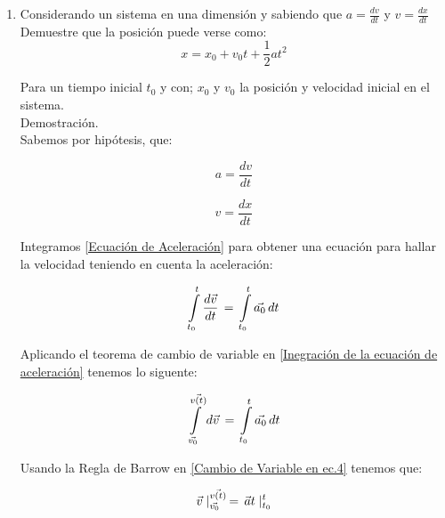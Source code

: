 \documentclass[letterpaper, 12pt]{article}
\begin{document}
\begin{enumerate}
    \item Considerando un sistema en una dimensión y sabiendo que $a = \frac{dv}{dt}$ y $v = \frac{dx}{dt}$ Demuestre que la posición puede verse como: 
    \begin{equation}
        \label{Ecuación a demostrar}
        x = x_{0} + v_{0}t + \frac{1}{2} at^{2}
    \end{equation}
    
    Para un tiempo inicial $t_{0}$ y con; $x_{0}$ y $v_{0}$ la posición y velocidad inicial en el sistema.\\
    
    Demostración.\\
    
    Sabemos por hipótesis, que: 
    
    \begin{equation}
        \label{Ecuación de Aceleración}
        a = \frac{dv}{dt}
    \end{equation}
    
    \begin{equation}
        \label{Ecuación de velocidad}
        v = \frac{dx}{dt}
    \end{equation}
    
    Integramos \ref{Ecuación de Aceleración} para obtener una ecuación para hallar la velocidad teniendo en cuenta la aceleración: 
    
    \begin{equation}
        \label{Inegración de la ecuación de aceleración}
        \int\limits_{t_{0}}^{t} \frac{d\Vec{v}}{dt} \thinspace = \thinspace \int\limits_{t_{0}}^{t} \Vec{a_{0}} \thinspace dt
    \end{equation}
    
    Aplicando el teorema de cambio de variable en \ref{Inegración de la ecuación de aceleración} tenemos lo siguente:
    
    \begin{equation}
        \label{Cambio de Variable en ec.4}
        \int\limits_{\Vec{v_{0}}}^{\Vec{v(t)}} d\Vec{v} \thinspace = \thinspace \int\limits_{t_{0}}^{t} \Vec{a_{0}} \thinspace dt
    \end{equation}
    
    Usando la Regla de Barrow en \ref{Cambio de Variable en ec.4} tenemos que:
    
    \begin{equation}
        \label{Regla de Barrow en ec.5}
        \vec{v}\mid_{\vec{v_{0}}}^{\vec{v(t)}} \thinspace = \thinspace \vec{a}t\mid_{t_{0}}^{t}
    \end{equation}
    

\end{enumerate}
\end{document}
